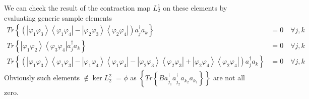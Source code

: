 \documentclass[aps,preprint]{revtex4}%
\begin{document}
We can check the result of the contraction map $L_{2}^{1}$ on these elements
by evaluating generic sample elements
\begin{align}
Tr\left\{  \left(  \left\vert \varphi_{1}\varphi_{3}\right\rangle \left\langle
\varphi_{1}\varphi_{4}\right\vert -\left\vert \varphi_{2}\varphi
_{3}\right\rangle \left\langle \varphi_{2}\varphi_{4}\right\vert \right)
a_{j}^{\dagger}a_{k}\right\}   &  =0\quad\forall j,k\nonumber\\
Tr\left\{  \left\vert \varphi_{1}\varphi_{2}\right\rangle \left\langle
\varphi_{3}\varphi_{4}\right\vert a_{j}^{\dagger}a_{k}\right\}   &
=0\quad\forall j,k\nonumber\\
Tr\left\{  \left(  \left\vert \varphi_{1}\varphi_{3}\right\rangle \left\langle
\varphi_{1}\varphi_{3}\right\vert -\left\vert \varphi_{1}\varphi
_{4}\right\rangle \left\langle \varphi_{1}\varphi_{4}\right\vert -\left\vert
\varphi_{2}\varphi_{3}\right\rangle \left\langle \varphi_{2}\varphi
_{3}\right\vert +\left\vert \varphi_{2}\varphi_{4}\right\rangle \left\langle
\varphi_{2}\varphi_{4}\right\vert \right)  a_{j}^{\dagger}a_{k}\right\}   &
=0\quad\forall j,k
\end{align}
Obviously such elements $\notin\ker L_{2}^{2}$ $=\phi$ as $\left\{  Tr\left\{
Ba_{j_{1}}^{\dagger}a_{j_{2}}^{\dagger}a_{k_{2}}a_{k_{1}}\right\}  \right\}  $
are not all zero.
\end{document}
